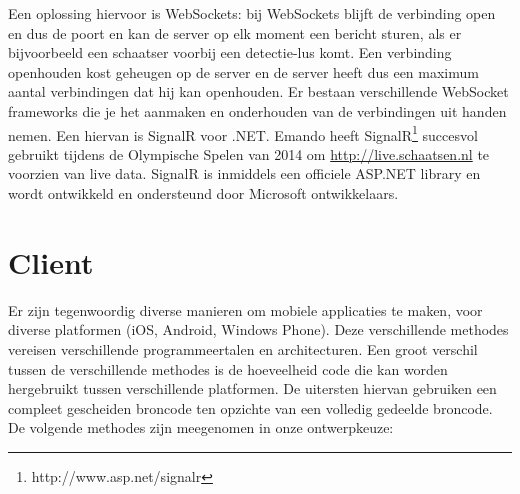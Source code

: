 Een oplossing hiervoor is WebSockets: bij WebSockets blijft de verbinding open en dus de poort en kan de server op elk moment een bericht sturen, als er bijvoorbeeld een schaatser voorbij een detectie-lus komt. Een verbinding openhouden kost geheugen op de server en de server heeft dus een maximum aantal verbindingen dat hij kan openhouden. Er bestaan verschillende WebSocket frameworks die je het aanmaken en onderhouden van de verbindingen uit handen nemen. Een hiervan is SignalR voor .NET. Emando heeft SignalR\footnote{http://www.asp.net/signalr} succesvol gebruikt tijdens de Olympische Spelen van 2014 om \url{http://live.schaatsen.nl} te voorzien van live data. SignalR is inmiddels een officiele ASP.NET library en wordt ontwikkeld en ondersteund door Microsoft ontwikkelaars.

\section{Client}
Er zijn tegenwoordig diverse manieren om mobiele applicaties te maken, voor diverse platformen (iOS, Android, Windows Phone). Deze verschillende methodes vereisen verschillende programmeertalen en architecturen. Een groot verschil tussen de verschillende methodes is de hoeveelheid code die kan worden hergebruikt tussen verschillende platformen. De uitersten hiervan gebruiken een compleet gescheiden broncode ten opzichte van een volledig gedeelde broncode. De volgende methodes zijn meegenomen in onze ontwerpkeuze:

